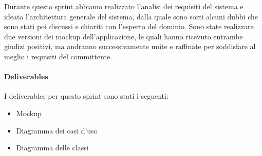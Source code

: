 Durante questo sprint abbiamo realizzato l'analisi dei requisiti del sistema e ideata l'architettura generale del sistema, dalla quale sono sorti alcuni dubbi che sono stati poi discussi e chiariti con l'esperto del dominio. Sono state realizzare due versioni dei mockup dell'applicazione, le quali hanno ricevuto entrambe giudizi positivi, ma andranno successivamente unite e raffinate per soddisfare al meglio i requisiti del committente.
\paragraph{Deliverables} 
I deliverables per questo sprint sono stati i seguenti:
\begin{itemize}
    \item Mockup
    \item Diagramma dei casi d'uso
    \item Diagramma delle classi
\end{itemize}
